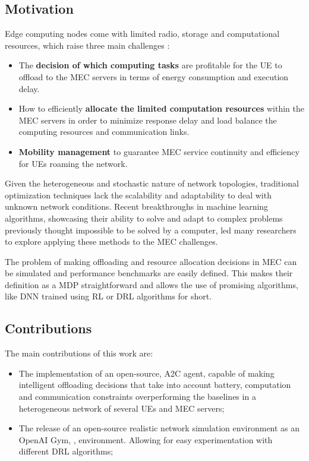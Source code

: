 \documentclass[conference]{IEEEtran}
\begin{document}
\subsection{Motivation}
\noindent Edge computing nodes come with limited radio, storage and computational resources, which raise three main challenges \cite{SHAKARAMI2020107496}:
\begin{itemize}
    \item The \textbf{decision of which computing tasks} are profitable for the \acrshort{UE} to offload to the \acrshort{MEC} servers in terms of energy consumption and execution delay.
    \item How to efficiently \textbf{allocate the limited computation resources} within the \acrshort{MEC} servers in order to minimize response delay and load balance the computing resources and communication links.
    \item \textbf{Mobility management} to guarantee \acrshort{MEC} service continuity and efficiency for \acrshort{UE}s roaming the network.
\end{itemize}

Given the heterogeneous and stochastic nature of network topologies, traditional optimization techniques lack the scalability and adaptability to deal with unknown network conditions. Recent breakthroughs in machine learning algorithms, showcasing their ability to solve and adapt to complex problems previously thought impossible to be solved by a computer, led many researchers to explore applying these methods to the \acrshort{MEC} challenges.
\par
The problem of making offloading and resource allocation decisions in \acrshort{MEC} can be simulated and performance benchmarks are easily defined. This makes their definition as a \acrfull{MDP} straightforward and allows the use of promising algorithms, like \acrfull{DNN} trained using \acrfull{RL} or \acrfull{DRL} algorithms for short. 

\subsection{Contributions}
\noindent The main contributions of this work are:
\begin{itemize}
    \item The implementation of an open-source, \acrshort{A2C} agent, capable of making intelligent offloading decisions that take into account battery, computation and communication constraints overperforming the baselines in a heterogeneous network of several \acrshort{UE}s and \acrshort{MEC} servers;
    \item The release of an open-source realistic network simulation environment as an OpenAI Gym, \cite{opengym}, environment. Allowing for easy experimentation with different \acrshort{DRL} algorithms;
\end{itemize}
\end{document}
